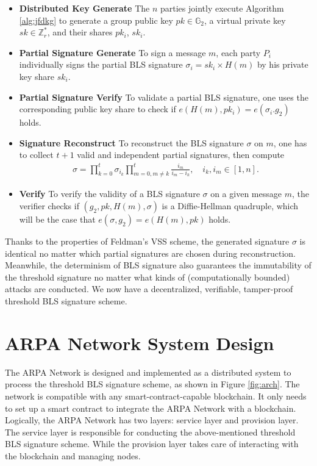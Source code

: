 \documentclass[11pt]{article}
\begin{document}
\begin{itemize}
    \item[] \textbf{Distributed Key Generate} The $n$ parties jointly execute Algorithm \ref{alg:jfdkg} to generate a group public key $pk \in \mathbb{G}_2$, a virtual private key $sk \in \mathbb{Z}_r^*$, and their shares $pk_i$, $sk_i$.
    \item[] \textbf{Partial Signature Generate} To sign a message $m$, each party $P_i$ individually signs the partial BLS signature $\sigma_i=sk_i \times H(m)$ by his private key share $sk_i$.
    \item[] \textbf{Partial Signature Verify} To validate a partial BLS signature, one uses the corresponding public key share to check if $e(H(m),pk_i)=e(\sigma_i.g_2)$ holds.
    \item[] \textbf{Signature Reconstruct} To reconstruct the BLS signature $\sigma$ on $m$, one has to collect $t+1$ valid and independent partial signatures, then compute
    \begin{align*}
        \sigma = \prod_{k=0}^t \sigma_{i_k} \prod_{m=0, m\neq k}^t \frac{i_m}{i_m-i_k},\quad i_k, i_m \in [1,n].
    \end{align*}
    \item[] \textbf{Verify} To verify the validity of a BLS signature $\sigma$ on a given message $m$, the verifier checks if $(g_2,pk,H(m),\sigma)$ is a Diffie-Hellman quadruple, which will be the case that $e(\sigma,g_2)=e(H(m),pk)$ holds.
\end{itemize}

Thanks to the properties of Feldman's VSS scheme, the generated signature $\sigma$ is identical no matter which partial signatures are chosen during reconstruction. Meanwhile, the determinism of BLS signature also guarantees the immutability of the threshold signature no matter what kinds of (computationally bounded) attacks are conducted. We now have a decentralized, verifiable, tamper-proof threshold BLS signature scheme.

\section{ARPA Network System Design}

The ARPA Network is designed and implemented as a distributed system to process the threshold BLS signature scheme, as shown in Figure \ref{fig:arch}. The network is compatible with any smart-contract-capable blockchain. It only needs to set up a smart contract to integrate the ARPA Network with a blockchain. Logically, the ARPA Network has two layers: service layer and provision layer. The service layer is responsible for conducting the above-mentioned threshold BLS signature scheme. While the provision layer takes care of interacting with the blockchain and managing nodes.
\end{document}
